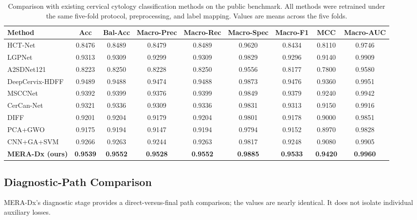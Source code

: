 \documentclass[conference]{IEEEtran}
\begin{document}
\begin{table}[!t]
\centering
\small
\caption{Comparison with existing cervical cytology classification methods on
the public benchmark. All methods were retrained under the same five-fold
protocol, preprocessing, and label mapping. Values are means across the five
folds.}
\label{tab:public_comparison}
\setlength{\tabcolsep}{4pt}
\begin{tabular*}{\textwidth}{@{\extracolsep{\fill}}lcccccccc@{}}
\toprule
\textbf{Method} & \textbf{Acc} & \textbf{Bal-Acc} & \textbf{Macro-Prec} & \textbf{Macro-Rec} & \textbf{Macro-Spec} & \textbf{Macro-F1} & \textbf{MCC} & \textbf{Macro-AUC} \\
\midrule
HCT-Net         & 0.8476 & 0.8489 & 0.8479 & 0.8489 & 0.9620 & 0.8434 & 0.8110 & 0.9746 \\
LGPNet          & 0.9313 & 0.9309 & 0.9299 & 0.9309 & 0.9829 & 0.9296 & 0.9140 & 0.9909 \\
A2SDNet121      & 0.8223 & 0.8250 & 0.8228 & 0.8250 & 0.9556 & 0.8177 & 0.7800 & 0.9580 \\
DeepCervix-HDFF & 0.9489 & 0.9488 & 0.9474 & 0.9488 & 0.9873 & 0.9476 & 0.9360 & 0.9951 \\
MSCCNet         & 0.9392 & 0.9399 & 0.9376 & 0.9399 & 0.9849 & 0.9379 & 0.9240 & 0.9942 \\
CerCan-Net      & 0.9321 & 0.9336 & 0.9309 & 0.9336 & 0.9831 & 0.9313 & 0.9150 & 0.9916 \\
DIFF            & 0.9201 & 0.9204 & 0.9179 & 0.9204 & 0.9801 & 0.9178 & 0.9000 & 0.9851 \\
PCA+GWO         & 0.9175 & 0.9194 & 0.9147 & 0.9194 & 0.9794 & 0.9152 & 0.8970 & 0.9828 \\
CNN+GA+SVM      & 0.9266 & 0.9263 & 0.9244 & 0.9263 & 0.9817 & 0.9248 & 0.9080 & 0.9905 \\
\midrule
\textbf{MERA-Dx (ours)} & \textbf{0.9539} & \textbf{0.9552} & \textbf{0.9528} & \textbf{0.9552} & \textbf{0.9885} & \textbf{0.9533} & \textbf{0.9420} & \textbf{0.9960} \\
\bottomrule
\end{tabular*}
\end{table}

\subsection{Diagnostic-Path Comparison}
\label{sec:path_comparison}
MERA-Dx's diagnostic stage provides a direct-versus-final path
comparison; the values are nearly identical. It does not isolate
individual auxiliary losses.
\end{document}
